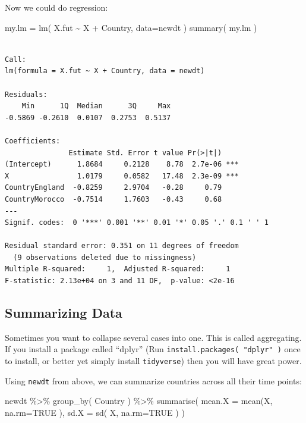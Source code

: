 \documentclass[
  letterpaper,
  DIV=11,
  numbers=noendperiod]{scrreprt}
\newenvironment{Shaded}{\begin{snugshade}}{\end{snugshade}}
\newcommand{\AttributeTok}[1]{\textcolor[rgb]{0.49,0.56,0.16}{#1}}
\newcommand{\ConstantTok}[1]{\textcolor[rgb]{0.53,0.00,0.00}{#1}}
\newcommand{\FunctionTok}[1]{\textcolor[rgb]{0.02,0.16,0.49}{#1}}
\newcommand{\NormalTok}[1]{\textcolor[rgb]{0.00,0.44,0.13}{#1}}
\newcommand{\OtherTok}[1]{\textcolor[rgb]{0.00,0.44,0.13}{#1}}
\newcommand{\SpecialCharTok}[1]{\textcolor[rgb]{0.25,0.44,0.63}{#1}}
\begin{document}
Now we could do regression:

\begin{Shaded}
\begin{Highlighting}[]
\NormalTok{my.lm }\OtherTok{=} \FunctionTok{lm}\NormalTok{( X.fut }\SpecialCharTok{\textasciitilde{}}\NormalTok{ X }\SpecialCharTok{+}\NormalTok{ Country, }\AttributeTok{data=}\NormalTok{newdt )}
\FunctionTok{summary}\NormalTok{( my.lm )}
\end{Highlighting}
\end{Shaded}

\begin{verbatim}

Call:
lm(formula = X.fut ~ X + Country, data = newdt)

Residuals:
    Min      1Q  Median      3Q     Max 
-0.5869 -0.2610  0.0107  0.2753  0.5137 

Coefficients:
               Estimate Std. Error t value Pr(>|t|)    
(Intercept)      1.8684     0.2128    8.78  2.7e-06 ***
X                1.0179     0.0582   17.48  2.3e-09 ***
CountryEngland  -0.8259     2.9704   -0.28     0.79    
CountryMorocco  -0.7514     1.7603   -0.43     0.68    
---
Signif. codes:  0 '***' 0.001 '**' 0.01 '*' 0.05 '.' 0.1 ' ' 1

Residual standard error: 0.351 on 11 degrees of freedom
  (9 observations deleted due to missingness)
Multiple R-squared:     1,  Adjusted R-squared:     1 
F-statistic: 2.13e+04 on 3 and 11 DF,  p-value: <2e-16
\end{verbatim}

\hypertarget{summarizing-data}{%
\subsection{Summarizing Data}\label{summarizing-data}}

Sometimes you want to collapse several cases into one. This is called
aggregating. If you install a package called ``dplyr'' (Run
\texttt{install.packages(\ "dplyr"\ )} once to install, or better yet
simply install \texttt{tidyverse}) then you will have great power.

Using \texttt{newdt} from above, we can summarize countries across all
their time points:

\begin{Shaded}
\begin{Highlighting}[]
\NormalTok{newdt }\SpecialCharTok{\%\textgreater{}\%} \FunctionTok{group\_by}\NormalTok{( Country ) }\SpecialCharTok{\%\textgreater{}\%} 
    \FunctionTok{summarise}\NormalTok{( }\AttributeTok{mean.X =} \FunctionTok{mean}\NormalTok{(X, }\AttributeTok{na.rm=}\ConstantTok{TRUE}\NormalTok{ ),}
        \AttributeTok{sd.X =} \FunctionTok{sd}\NormalTok{( X, }\AttributeTok{na.rm=}\ConstantTok{TRUE}\NormalTok{ ) )}
\end{Highlighting}
\end{Shaded}
\end{document}
